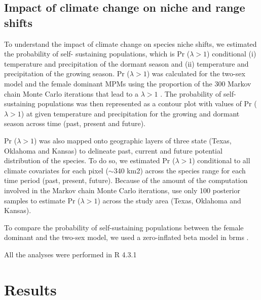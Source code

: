 \documentclass[12pt]{article}
\newcommand{\tom}[2]{{\color{red}{#1}}\footnote{\textit{\color{red}{#2}}}}
\begin{document}
\subsection*{Impact of climate change on niche and range shifts}
To understand the impact of climate change on species niche shifts, we estimated the probability of self- sustaining populations, which is Pr ($\lambda > 1$) conditional (i) temperature and precipitation of the dormant season and (ii) temperature and precipitation of the growing season.
Pr ($\lambda > 1$) was calculated for the two-sex model and the female dominant MPMs using the proportion of the 300 Markov chain Monte Carlo iterations that lead to a $\lambda > 1$ \citep{diez2014probabilistic}.
The probability of self- sustaining populations was then represented as a contour plot with values of Pr ($\lambda > 1$) at given temperature and precipitation for the growing and dormant season across time (past, present and future). 

Pr ($\lambda > 1$) was also mapped onto geographic layers of three state (Texas, Oklahoma and Kansas) to delineate past, current and future potential distribution of the species.
To do so, we estimated Pr ($\lambda > 1$) conditional to all climate covariates for each pixel ($\sim$340 km2) across the species range for each time period (past, present, future).
Because of the amount of the computation involved in the Markov chain Monte Carlo iterations, use only 100 posterior samples to estimate Pr ($\lambda > 1$) across the study area (Texas, Oklahoma and Kansas).

To compare the probability of self-sustaining populations between the female dominant and the two-sex model, we used a zero-inflated beta model in brms \citep{brms}. 

All the analyses were performed in R 4.3.1 \citep{RCoreteam}

\section*{Results}
\end{document}
